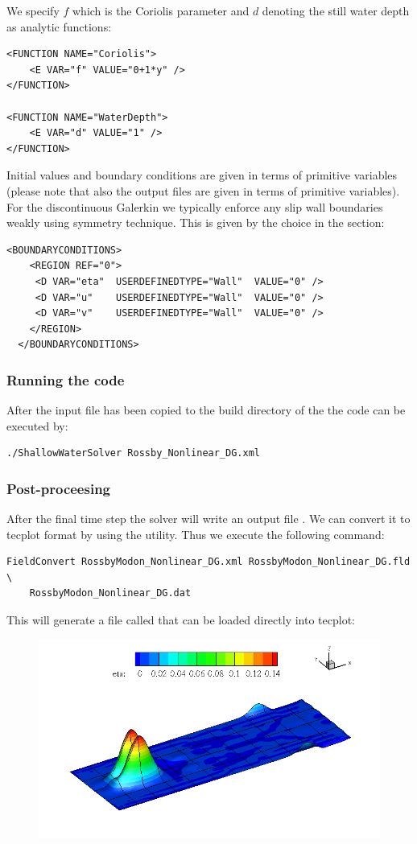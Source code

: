 We specify $f$ which is the Coriolis parameter and $d$ denoting the
still water depth as analytic functions:
\begin{lstlisting}[style=XmlStyle]
<FUNCTION NAME="Coriolis">
    <E VAR="f" VALUE="0+1*y" />
</FUNCTION>

<FUNCTION NAME="WaterDepth">
    <E VAR="d" VALUE="1" />
</FUNCTION>
\end{lstlisting}

Initial values and boundary conditions are given in terms of primitive variables
(please note that also the output files are given in terms of primitive
variables). For the discontinuous Galerkin we typically enforce any slip wall boundaries
weakly using symmetry technique. This is given by the
 choice in the 
section:
\begin{lstlisting}[style=XmlStyle]
  <BOUNDARYCONDITIONS>
    <REGION REF="0">
     <D VAR="eta"  USERDEFINEDTYPE="Wall"  VALUE="0" />
     <D VAR="u"    USERDEFINEDTYPE="Wall"  VALUE="0" />
     <D VAR="v"    USERDEFINEDTYPE="Wall"  VALUE="0" />
    </REGION>
  </BOUNDARYCONDITIONS>
\end{lstlisting}

\subsubsection{Running the code}

After the input file has been copied to the build directory
of the  the code can be executed by:
\begin{lstlisting}[style=BashInputStyle]
 ./ShallowWaterSolver Rossby_Nonlinear_DG.xml
\end{lstlisting}

\subsubsection{Post-proceesing}
After the final time step the solver will write an output file 
. We can convert it to tecplot
format by using the  utility. Thus we execute the
following command:
\begin{lstlisting}[style=BashInputStyle]
FieldConvert RossbyModon_Nonlinear_DG.xml RossbyModon_Nonlinear_DG.fld \
    RossbyModon_Nonlinear_DG.dat
\end{lstlisting}
This will generate a file called  that
can be loaded directly into tecplot:

\begin{figure}
\includegraphics[width=\linewidth]{Figures/RossbyModon.png}
\end{figure}
